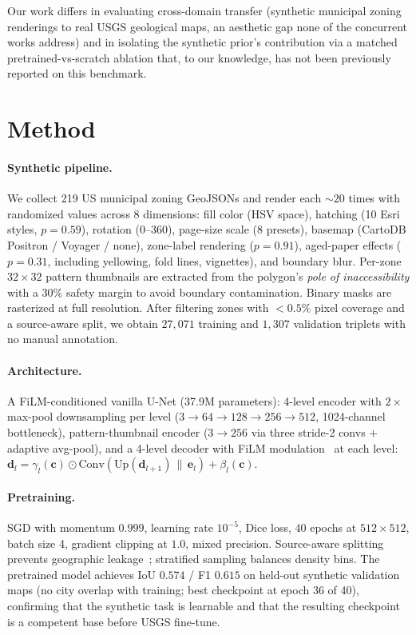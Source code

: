 \documentclass[sigconf,nonacm]{acmart}
\begin{document}
Our work differs in evaluating cross-domain transfer (synthetic municipal
zoning renderings to real USGS geological maps, an aesthetic gap none of the
concurrent works address) and in isolating the synthetic prior's contribution
via a matched pretrained-vs-scratch ablation that, to our knowledge, has not
been previously reported on this benchmark.


\section{Method}
\label{sec:method}

\paragraph{Synthetic pipeline.} We collect 219 US municipal zoning GeoJSONs
and render each ${\sim}20$ times with randomized values across 8 dimensions:
fill color (HSV space), hatching (10 Esri styles, $p{=}0.59$), rotation
(0--360\textdegree), page-size scale (8 presets), basemap (CartoDB Positron /
Voyager / none), zone-label rendering ($p{=}0.91$), aged-paper effects
($p{=}0.31$, including yellowing, fold lines, vignettes), and boundary blur.
Per-zone $32{\times}32$ pattern thumbnails are extracted from the polygon's
\emph{pole of inaccessibility} with a 30\% safety margin to avoid boundary
contamination. Binary masks are rasterized at full resolution. After
filtering zones with ${<}0.5\%$ pixel coverage and a source-aware split,
we obtain $27{,}071$ training and $1{,}307$ validation triplets with no
manual annotation.

\paragraph{Architecture.} A FiLM-conditioned vanilla U-Net (37.9M parameters):
4-level encoder with $2\times$ max-pool downsampling per level
($3{\to}64{\to}128{\to}256{\to}512$, 1024-channel bottleneck), pattern-thumbnail
encoder ($3{\to}256$ via three stride-2 convs $+$ adaptive avg-pool), and a
4-level decoder with FiLM modulation~\cite{perez2018film} at each level:
$\mathbf{d}_l = \gamma_l(\mathbf{c}) \odot \mathrm{Conv}(\mathrm{Up}(\mathbf{d}_{l+1}) \,\|\, \mathbf{e}_l) + \beta_l(\mathbf{c})$.

\paragraph{Pretraining.} SGD with momentum $0.999$, learning rate $10^{-5}$,
Dice loss, 40 epochs at $512{\times}512$, batch size 4, gradient clipping at
$1.0$, mixed precision. Source-aware splitting prevents geographic
leakage~\cite{lin2023loam}; stratified sampling balances density bins.
The pretrained model achieves IoU $0.574$ / F1 $0.615$ on held-out synthetic
validation maps (no city overlap with training; best checkpoint at epoch 36
of 40), confirming that the synthetic task is learnable and that the resulting
checkpoint is a competent base before USGS fine-tune.
\end{document}
